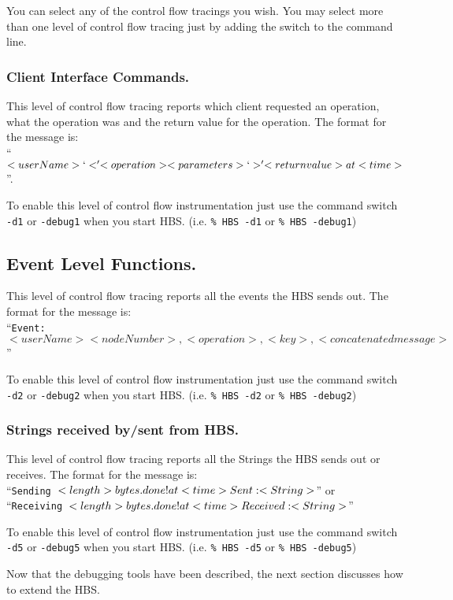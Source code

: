 You can select any of the control flow tracings you wish.  You may select
more than one level of control flow tracing just by adding the switch to
the command line.

\subsubsection{Client Interface Commands.}

This level of control flow tracing reports which client requested an
operation, what the operation was and the return value for the operation.
The format for the message is: \\ ``{\tt $<userName> `<'  <operation>
<parameters> `>' <return value> at <time>$}''.

To enable this level of control flow instrumentation just use the command
switch {\tt -d1} or {\tt -debug1}  when you start HBS. (i.e. {\tt \% HBS
-d1} or {\tt \% HBS -debug1})
\subsection{Event Level Functions.}
This level of control flow tracing reports all the events the HBS sends
out.  The format for the message is: \\  ``{\tt Event: $<userName> <nodeNumber>,
<operation>, <key>, <concatenated message>$}''

To enable this level of control flow instrumentation just use the command
switch {\tt -d2} or {\tt -debug2}  when you start HBS. (i.e. {\tt \% HBS
-d2} or {\tt \% HBS -debug2})
%
%
\subsubsection{Strings received by/sent from HBS.}
This level of control flow tracing reports all the Strings the HBS sends
out or receives.  The format for the message is: \\ ``{\tt Sending $<length> bytes
. done! at <time> \\  Sent: <String>$}'' or \\ ``{\tt Receiving $<length>
bytes . done! at <time> \\ Received : <String>$}''

To enable this level of control flow instrumentation just use the command
switch {\tt -d5} or {\tt -debug5}  when you start HBS. (i.e. {\tt \% HBS
-d5} or {\tt \% HBS -debug5})


Now that the debugging tools have been described, the next section
discusses how to extend the HBS.







